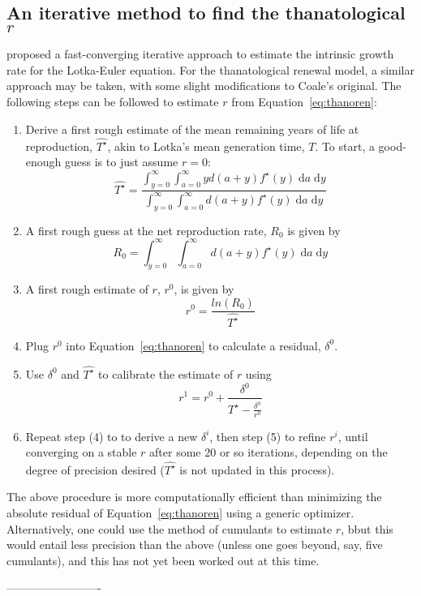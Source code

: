 \documentclass{article}
\newcommand{\dd}{\; \mathrm{d}}
\begin{document}
\begin{appendices}
\section{An iterative method to find the thanatological $r$}
\label{app:C}
\citet{coale1957new} proposed a fast-converging iterative approach to estimate
the intrinsic growth rate for the Lotka-Euler equation. For the thanatological
renewal model, a similar approach may be taken, with some slight
modifications to Coale's original.
The following steps can be followed to estimate $r$ from
Equation~\eqref{eq:thanoren}:

\begin{enumerate}
  \item Derive a first rough estimate of the mean remaining years of life at
  reproduction, $\widehat{T^\star}$, akin to Lotka's mean generation time, $T$.
  To start, a good-enough guess is to just assume $r=0$:
\begin{equation}
\widehat{T^\star} = \frac{\int _{y=0}^\infty \int _{a=0}^\infty y d (a+y)
f^\star(y) \dd a \dd y}{\int _{y=0}^\infty \int _{a=0}^\infty d(a+y) f^\star(y)
\dd a \dd y}
\end{equation}
  \item A first rough guess at the net reproduction rate, $R_0$ is given by
 \begin{equation}
  R_0 = \int _{y=0}^\infty \int _{a=0}^\infty d(a+y) f^\star(y) \dd a
\dd y
\end{equation}
  \item A first rough estimate of $r$, $r^0$, is given by
   \begin{equation}
   r^0 = \frac{ln(R_0)}{\widehat{T^\star}}
   \end{equation}
  \item Plug $r^0$ into Equation~\eqref{eq:thanoren} to calculate a
  residual, $\delta^0$.
  \item Use $\delta^0$ and $\widehat{T^\star}$ to calibrate the estimate of $r$
  using
  \begin{equation}
  r^{1} = r^0 + \frac{\delta^0}{\widehat{T^\star} - \frac{\delta^0}{r^0}}
  \end{equation}
  \item Repeat step (4) to to derive a new $\delta^i$, then step (5) to refine
  $r^i$, until converging on a stable $r$ after some 20 or so iterations,
  depending on the degree of precision desired ($\widehat{T^\star}$ is not updated
  in this process).
\end{enumerate}

The above procedure is more computationally efficient than minimizing the
absolute residual of Equation~\eqref{eq:thanoren} using a generic
optimizer. Alternatively, one could use the method of cumulants to estimate $r$,
bbut this would entail less precision than the above (unless one goes beyond,
say, five cumulants), and this has not yet been worked out at this time.
 
\end{appendices}
\nocite{HMD,HFD}
-------------------------

    
\end{document}

